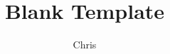 \documentclass{article}
\begin{document}
\title{Blank Template}
\author{Chris}
\date{}
\maketitle
\end{document}
